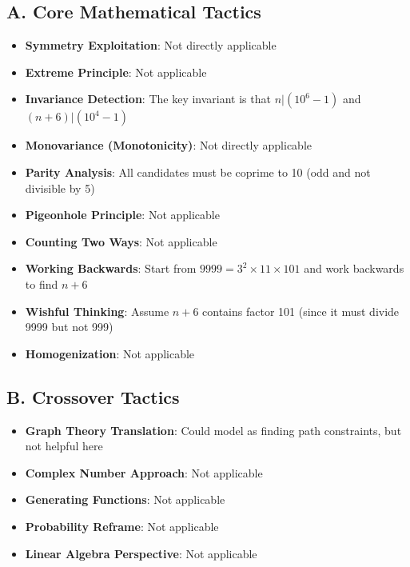 \documentclass[11pt]{article}
\begin{document}
\begin{tacticalbox}
\subsection*{A. Core Mathematical Tactics}
\begin{itemize}[leftmargin=*]
    \item \textbf{Symmetry Exploitation}: Not directly applicable
    
    \item \textbf{Extreme Principle}: Not applicable
    
    \item \textbf{Invariance Detection}: The key invariant is that $n | (10^6 - 1)$ and $(n+6) | (10^4 - 1)$
    
    \item \textbf{Monovariance (Monotonicity)}: Not directly applicable
    
    \item \textbf{Parity Analysis}: All candidates must be coprime to 10 (odd and not divisible by 5)
    
    \item \textbf{Pigeonhole Principle}: Not applicable
    
    \item \textbf{Counting Two Ways}: Not applicable
    
    \item \textbf{Working Backwards}: Start from $9999 = 3^2 \times 11 \times 101$ and work backwards to find $n+6$
    
    \item \textbf{Wishful Thinking}: Assume $n+6$ contains factor 101 (since it must divide 9999 but not 999)
    
    \item \textbf{Homogenization}: Not applicable
\end{itemize}

\subsection*{B. Crossover Tactics}
\begin{itemize}[leftmargin=*]
    \item \textbf{Graph Theory Translation}: Could model as finding path constraints, but not helpful here
    
    \item \textbf{Complex Number Approach}: Not applicable
    
    \item \textbf{Generating Functions}: Not applicable
    
    \item \textbf{Probability Reframe}: Not applicable
    
    \item \textbf{Linear Algebra Perspective}: Not applicable
\end{itemize}
\end{tacticalbox}
\end{document}
